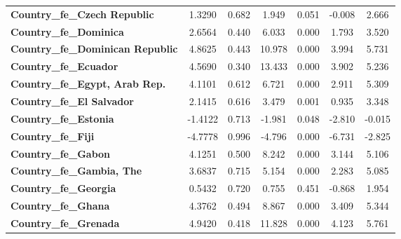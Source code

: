 \begin{center}
\begin{tabular}{lcccccc}
\textbf{Country\_fe\_Czech Republic}                 &       1.3290  &        0.682     &     1.949  &         0.051        &       -0.008    &        2.666     \\
\textbf{Country\_fe\_Dominica}                       &       2.6564  &        0.440     &     6.033  &         0.000        &        1.793    &        3.520     \\
\textbf{Country\_fe\_Dominican Republic}             &       4.8625  &        0.443     &    10.978  &         0.000        &        3.994    &        5.731     \\
\textbf{Country\_fe\_Ecuador}                        &       4.5690  &        0.340     &    13.433  &         0.000        &        3.902    &        5.236     \\
\textbf{Country\_fe\_Egypt, Arab Rep.}               &       4.1101  &        0.612     &     6.721  &         0.000        &        2.911    &        5.309     \\
\textbf{Country\_fe\_El Salvador}                    &       2.1415  &        0.616     &     3.479  &         0.001        &        0.935    &        3.348     \\
\textbf{Country\_fe\_Estonia}                        &      -1.4122  &        0.713     &    -1.981  &         0.048        &       -2.810    &       -0.015     \\
\textbf{Country\_fe\_Fiji}                           &      -4.7778  &        0.996     &    -4.796  &         0.000        &       -6.731    &       -2.825     \\
\textbf{Country\_fe\_Gabon}                          &       4.1251  &        0.500     &     8.242  &         0.000        &        3.144    &        5.106     \\
\textbf{Country\_fe\_Gambia, The}                    &       3.6837  &        0.715     &     5.154  &         0.000        &        2.283    &        5.085     \\
\textbf{Country\_fe\_Georgia}                        &       0.5432  &        0.720     &     0.755  &         0.451        &       -0.868    &        1.954     \\
\textbf{Country\_fe\_Ghana}                          &       4.3762  &        0.494     &     8.867  &         0.000        &        3.409    &        5.344     \\
\textbf{Country\_fe\_Grenada}                        &       4.9420  &        0.418     &    11.828  &         0.000        &        4.123    &        5.761     \\

\end{tabular}
\end{center}
